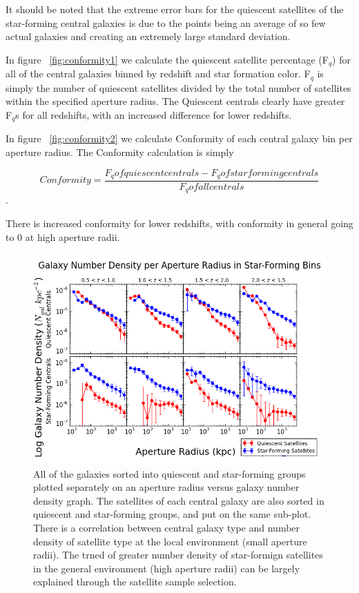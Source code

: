 \documentclass[apj]{emulateapj}
\begin{document}
It should be noted that the extreme error bars for the quiescent satellites of the star-forming central galaxies is due to the points being an average of so few actual galaxies and creating an extremely large standard deviation. 

In figure ~\ref{fig:conformity1} we calculate the quiescent satellite percentage (F$_{q}$) for all of the central galaxies binned by redshift and star formation color. F$_{q}$ is simply the number of quiescent satellites divided by the total number of satellites within the specified aperture radius. The Quiescent centrals clearly have greater F$_{q}$s for all redshifts, with an increased difference for lower redshifts.

In figure ~\ref{fig:conformity2} we calculate Conformity of each central galaxy bin per aperture radius. The Conformity calculation is simply

$$Conformity = \frac{F_{q} of quiescent centrals - F_{q} of star forming centrals}{F_{q} of all centrals}$$.

There is increased conformity for lower redshifts, with conformity in general going to 0 at high aperture radii.



\begin{figure}
\centering
\graphicspath{{C:/3d_hst/2015_finals/Colors/}}
\includegraphics[width=\linewidth]{colorpanel}
\caption{\footnotesize All of the galaxies sorted into quiescent and star-forming groups plotted separately on an aperture radius versus galaxy number density graph. The satellites of each central galaxy are also sorted in quiescent and star-forming groups, and put on the same sub-plot. There is a correlation between central galaxy type and number density of satellite type at the local environment (small aperture radii). The trned of greater number density of star-formign satellites in the general environment (high aperture radii) can be largely explained through the satellite sample selection.}
\label{fig:color_panel}
\end{figure}
\end{document}
